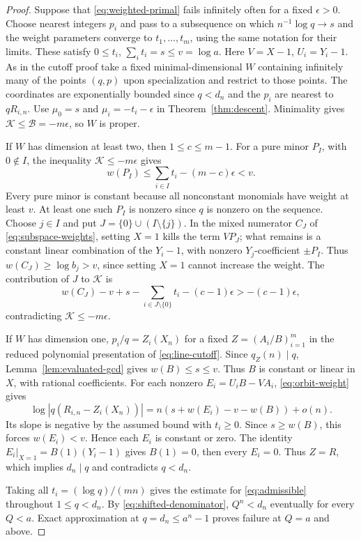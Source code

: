 \documentclass[11pt,a4paper,reqno]{amsart}
\theoremstyle{definition}
\theoremstyle{remark}
\numberwithin{equation}{section}
\begin{document}
\begin{proof}
Suppose that \eqref{eq:weighted-primal} fails infinitely often for a
fixed \(\epsilon>0\). Choose nearest integers \(p_i\) and pass to a
subsequence on which \(n^{-1}\log q\to s\) and the weight parameters
converge to \(t_1,\ldots,t_m\), using the same notation for their
limits. These satisfy \(0\le t_i\), \(\sum_i t_i=s\le v=\log a\).
Here \(V=X-1\), \(U_i=Y_i-1\).
As in the cutoff proof take a fixed minimal-dimensional \(W\)
containing infinitely many of the points \((q,p)\) upon specialization
and restrict to those points. The coordinates are exponentially
bounded since \(q<d_n\) and the \(p_i\) are nearest to \(qR_{i,n}\).
Use \(\mu_0=s\) and \(\mu_i=-t_i-\epsilon\) in
Theorem~\ref{thm:descent}. Minimality gives
\(\mathcal K\le\mathcal B=-m\epsilon\), so \(W\) is proper.

If \(W\) has dimension at least two, then \(1\le c\le m-1\).
For a pure minor \(P_I\), with \(0\notin I\), the inequality
\(\mathcal K\le-m\epsilon\) gives
\[
 w(P_I)\le\sum_{i\in I}t_i-(m-c)\epsilon<v .
\]
Every pure minor is constant because all nonconstant monomials
have weight at least \(v\). At least one such \(P_I\) is nonzero
since \(q\) is nonzero on the sequence. Choose \(j\in I\) and
put \(J=\{0\}\cup(I\setminus\{j\})\).
In the mixed numerator \(C_J\) of \eqref{eq:subspace-weights},
setting \(X=1\) kills the term \(VP_J\); what remains is a
constant linear combination of the \(Y_i-1\), with nonzero
\(Y_j\)-coefficient \(\pm P_I\). Thus \(w(C_J)\ge\log b_j>v\),
since setting \(X=1\) cannot increase the weight.
The contribution of \(J\) to \(\mathcal K\) is
\[
 w(C_J)-v+s-\sum_{i\in J\setminus\{0\}}t_i-(c-1)\epsilon
   >-(c-1)\epsilon,
\]
contradicting \(\mathcal K\le-m\epsilon\).

If \(W\) has dimension one, \(p_i/q=Z_i(X_n)\) for a fixed
\(Z=(A_i/B)_{i=1}^m\) in the reduced polynomial presentation
of \eqref{eq:line-cutoff}. Since \(q_Z(n)\mid q\),
Lemma~\ref{lem:evaluated-gcd} gives \(w(B)\le s\le v\).
Thus \(B\) is constant or linear in \(X\), with rational
coefficients. For each nonzero \(E_i=U_iB-VA_i\),
\eqref{eq:orbit-weight} gives
\[
 \log|q(R_{i,n}-Z_i(X_n))|
       =n(s+w(E_i)-v-w(B))+o(n).
\]
Its slope is negative by the assumed bound with \(t_i\ge0\).
Since \(s\ge w(B)\), this forces \(w(E_i)<v\). Hence each
\(E_i\) is constant or zero. The identity
\(E_i|_{X=1}=B(1)(Y_i-1)\) gives \(B(1)=0\), then every
\(E_i=0\). Thus \(Z=R\), which implies \(d_n\mid q\) and
contradicts \(q<d_n\).

Taking all \(t_i=(\log q)/(mn)\) gives the estimate for
\eqref{eq:admissible} throughout \(1\le q<d_n\).
By \eqref{eq:shifted-denominator}, \(Q^n<d_n\) eventually
for every \(Q<a\). Exact approximation at \(q=d_n\le a^n-1\)
proves failure at \(Q=a\) and above.
\end{proof}
\end{document}
